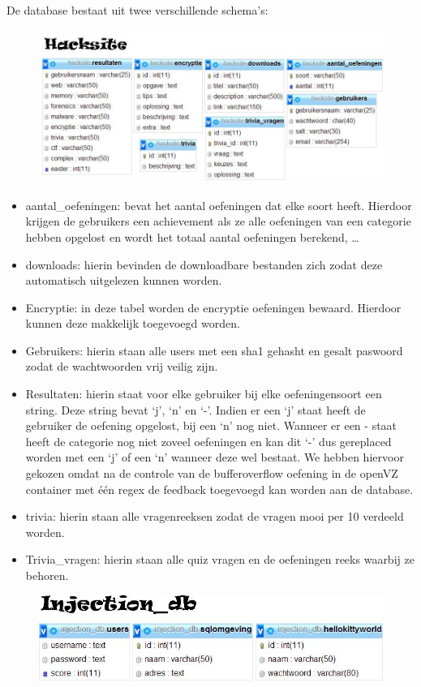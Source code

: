 De database bestaat uit twee verschillende schema’s:
\begin{figure}[H]
\centering
\includegraphics[scale=0.5]{systeem/db1.jpg}
\end{figure}
	\begin{itemize}
	\item aantal\_oefeningen: bevat het aantal oefeningen dat elke soort heeft. Hierdoor krijgen de gebruikers een achievement als ze alle oefeningen van een categorie hebben opgelost en wordt het totaal aantal oefeningen berekend, \ldots
	\item downloads: hierin bevinden de downloadbare bestanden zich zodat deze automatisch uitgelezen kunnen worden.
	\item Encryptie: in deze tabel worden de encryptie oefeningen bewaard. Hierdoor kunnen deze makkelijk toegevoegd worden.
	\item Gebruikers: hierin staan alle users met een sha1 gehasht en gesalt paswoord zodat de wachtwoorden vrij veilig zijn.
	\item Resultaten: hierin staat voor elke gebruiker bij elke oefeningensoort een string. Deze string bevat `j', `n' en `-'. Indien er een `j' staat heeft de gebruiker de oefening opgelost, bij een `n' nog niet. Wanneer er een - staat heeft de categorie nog niet zoveel oefeningen en kan dit `-' dus gereplaced worden met een `j' of een `n' wanneer deze wel bestaat. We hebben hiervoor gekozen omdat na de controle van de bufferoverflow oefening in de openVZ container met \'e\'en regex de feedback toegevoegd kan worden aan de database.
	\item trivia: hierin staan alle vragenreeksen zodat de vragen mooi per 10 verdeeld worden.
	\item Trivia\_vragen: hierin staan alle quiz vragen en de oefeningen reeks waarbij ze behoren.
	\end{itemize}
\begin{figure}[H]
\centering
\includegraphics[scale=0.5]{systeem/db2.jpg}
\end{figure}
